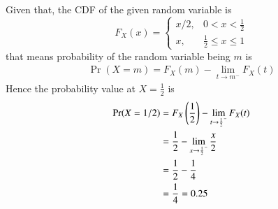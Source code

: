 Given that, the CDF of the given random variable is
$$
F_X(x)=\begin{cases}
			x/2, & 0<x<\frac{1}{2}\\
            x, & \frac{1}{2}\leq x\leq 1
		 \end{cases}
$$
that means probability of the random variable being $m$ is
\begin{align}
\Pr(X = m) =F_X(m) -  \lim_{t \to m^-}F_X(t)
\end{align}
Hence the probability value at $ X =\frac{1}{2}$ is
\begin{align}
    \Pr(X = 1/2) &= F_X\left(\dfrac{1}{2}\right) -\lim_{t \to \frac{1}{2}^-}F_X(t)\\
    &= \frac{1}{2} - \lim_{x \to \frac{1}{2}^-} \frac{x}{2}\\
    &= \frac{1}{2} - \frac{1}{4}\\
    &= \frac{1}{4} = 0.25
\end{align}

